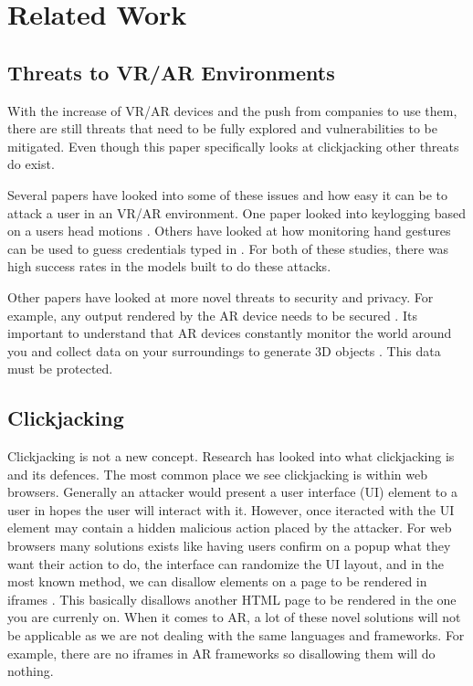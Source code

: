 \documentclass[conference]{IEEEtran}
\begin{document}
\section{Related Work}

\subsection{Threats to VR/AR Environments}

With the increase of VR/AR devices and the push from companies to use them, there are still threats that need to be fully explored and vulnerabilities to be mitigated. Even though this paper specifically looks at clickjacking other threats do exist. 

Several papers have looked into some of these issues and how easy it can be to attack a user in an VR/AR environment. One paper looked into keylogging based on a users head motions \cite{slocum_going_nodate}. Others have looked at how monitoring hand gestures can be used to guess credentials typed in \cite{gopal_hidden_nodate}. For both of these studies, there was high success rates in the models built to do these attacks. 

Other papers have looked at more novel threats to security and privacy. For example, any output rendered by the AR device needs to be secured \cite{dissanayake_review_2018}. Its important to understand that AR devices constantly monitor the world around you and collect data on your surroundings to generate 3D objects \cite{dissanayake_review_2018}. This data must be protected. 

\subsection{Clickjacking}

Clickjacking is not a new concept. Research has looked into what clickjacking is and its defences. The most common place we see clickjacking is within web browsers\cite{huang_clickjacking_nodate}. Generally an attacker would present a user interface (UI) element to a user in hopes the user will interact with it. However, once iteracted with the UI element may contain a hidden malicious action placed by the attacker. For web browsers many solutions exists like having users confirm on a popup what they want their action to do, the interface can randomize the UI layout, and in the most known method, we can disallow elements on a page to be rendered in iframes \cite{huang_clickjacking_nodate}. This basically disallows another HTML page to be rendered in the one you are currenly on. When it comes to AR, a lot of these novel solutions will not be applicable as we are not dealing with the same languages and frameworks. For example, there are no iframes in AR frameworks so disallowing them will do nothing. 
\end{document}
